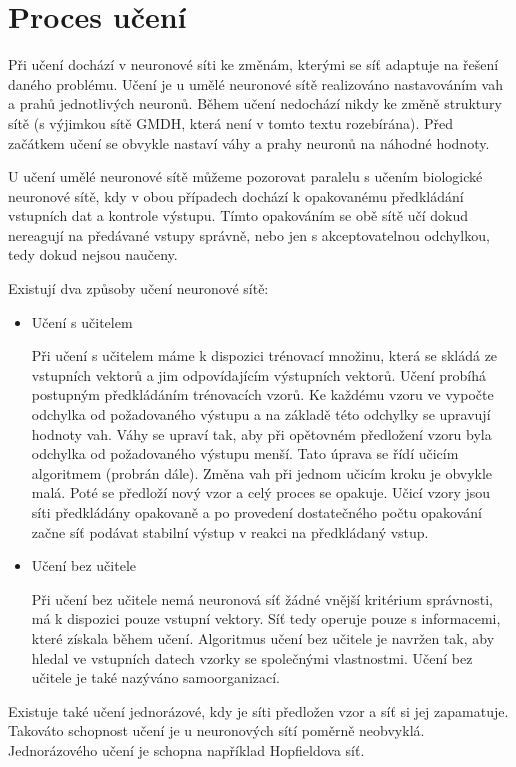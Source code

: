 \documentclass[11pt,twoside,a4paper]{book}
\begin{document}
\section{Proces učení}
Při učení dochází v neuronové síti ke změnám, kterými se síť adaptuje na řešení daného problému. Učení je u umělé neuronové sítě realizováno nastavováním vah a prahů jednotlivých neuronů. Během učení nedochází nikdy ke změně struktury sítě (s výjimkou sítě GMDH, která není v tomto textu rozebírána). Před začátkem učení se obvykle nastaví váhy a prahy neuronů na náhodné hodnoty.

U učení umělé neuronové sítě můžeme pozorovat paralelu s učením biologické neuronové sítě, kdy v obou případech dochází k opakovanému předkládání vstupních dat a kontrole výstupu. Tímto opakováním se obě sítě učí dokud nereagují na předávané vstupy správně, nebo jen s akceptovatelnou odchylkou, tedy dokud nejsou naučeny.

Existují dva způsoby učení neuronové sítě:
\begin{itemize}
\item Učení s učitelem

Při učení s učitelem máme k dispozici trénovací množinu, která se skládá ze vstupních vektorů a jim odpovídajícím výstupních vektorů. Učení probíhá postupným předkládáním trénovacích vzorů. Ke každému vzoru ve vypočte odchylka od požadovaného výstupu a na základě této odchylky se upravují hodnoty vah. Váhy se upraví tak, aby při opětovném předložení vzoru byla odchylka od požadovaného výstupu menší. Tato úprava se řídí učicím algoritmem (probrán dále). Změna vah při jednom učicím kroku je obvykle malá. Poté se předloží nový vzor a celý proces se opakuje. Učicí vzory jsou síti předkládány opakovaně a po provedení dostatečného počtu opakování začne síť podávat stabilní výstup v reakci na předkládaný vstup.

\item Učení bez učitele

Při učení bez učitele nemá neuronová síť žádné vnější kritérium správnosti, má k dispozici pouze vstupní vektory. Síť tedy operuje pouze s informacemi, které získala během učení. Algoritmus učení bez učitele je navržen tak, aby hledal ve vstupních datech vzorky se společnými vlastnostmi. Učení bez učitele je také nazýváno samoorganizací.
\end{itemize}
Existuje také učení jednorázové, kdy je síti předložen vzor a síť si jej zapamatuje. Takováto schopnost učení je u neuronových sítí poměrně neobvyklá. Jednorázového učení je schopna například Hopfieldova síť.
\end{document}
